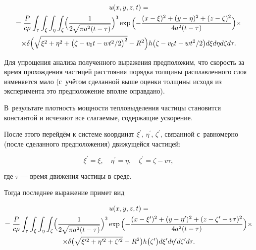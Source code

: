 \begin{multline}

 u(x,y,z,t)=\\

 =\frac{P}{c\rho} \int _\tau \int _\xi \int _\eta \int _\zeta

 \Bigl(\frac{1}{2\sqrt{\pi a^{2}(t-\tau)}}\Bigr)^{3}\exp {\Bigl(-\frac{(x-\xi)^{2}+(y-\eta)^{2}+(z-\zeta)^{2}}{4a^{2}(t-\tau)}\Bigr)}\times\\

 \times\delta\Bigl(\sqrt{\xi^{2}+\eta^{2}+\bigl(\zeta-v_{0}t-{wt^{2}}/{2}\bigr)^{2}}-R^{2}\Bigr)h\bigl(\zeta-v_{0}t-{wt^{2}}/{2}\bigr)d\xi d\eta d\zeta d\tau.

\end{multline}

Для упрощения анализа полученного выражения предположим, что скорость за время прохождения частицей расстояния порядка толщины расплавленного слоя изменяется мало (с~учётом сделанной выше  оценки толщины исходя из эксперимента это предположение вполне оправдано). 

В~результате  плотность мощности тепловыделения частицы становится константой и исчезают все слагаемые, содержащие ускорение. 

После этого перейдём к системе координат $\xi^{\prime}$, $\eta^{\prime}$, $\zeta^{\prime}$, связанной с~равномерно (после сделанного предположения) движущейся частицей:

\begin{equation}

    \xi^{\prime}=\xi, \quad \eta^{\prime}=\eta, \quad \zeta^{\prime}=\zeta-v\tau,

\end{equation}

где $\tau $ --- время движения частицы в среде. 

Тогда последнее выражение примет вид

\begin{multline}

 u(x,y,z,t)=\\

 =\frac{P}{c\rho} \int _\tau \int _\xi \int _\eta \int _\zeta

 \Bigl(\frac{1}{2\sqrt{\pi a^{2}(t-\tau)}}\Bigr)^{3}\exp {\Bigl(-\frac{(x-\xi^{\prime})^{2}+(y-\eta^{\prime})^{2}+(z-\zeta^{\prime}-v\tau)^{2}}{4a^{2}(t-\tau)}\Bigr)}\times\\

 \times\delta\bigl(\sqrt{\xi^{\prime2}+\eta^{\prime2}+\zeta^{\prime2}}-R^{2}\bigr) h\bigl(\zeta^{\prime}\bigr)d\xi^{\prime} d\eta^{\prime} d\zeta^{\prime} d\tau.

  \label{eq:math:ex10}

\end{multline}

